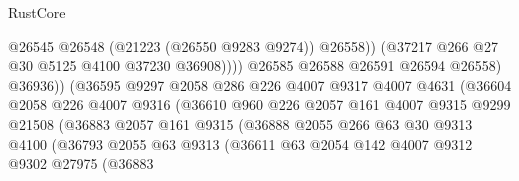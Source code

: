 \begin{lexlean}{RustCore}
\begin{coremodule}
                                              @26545
                                              @26548
                                              (@21223 (@26550 @9283 @9274))
                                              @26558))
                                          (@37217 @266 @27 @30 @5125 @4100 @37230 @36908))))
                                    @26585
                                    @26588
                                    @26591
                                    @26594
                                    @26558)
                                  @36936))
                              (@36595
                                @9297
                                @2058
                                @286
                                @226
                                @4007
                                @9317
                                @4007
                                @4631
                                (@36604
                                  @2058
                                  @226
                                  @4007
                                  @9316
                                  (@36610
                                    @960
                                    @226
                                    @2057
                                    @161
                                    @4007
                                    @9315
                                    @9299
                                    @21508
                                    (@36883
                                      @2057
                                      @161
                                      @9315
                                      (@36888
                                        @2055
                                        @266
                                        @63
                                        @30
                                        @9313
                                        @4100
                                        (@36793
                                          @2055
                                          @63
                                          @9313
                                          (@36611
                                            @63
                                            @2054
                                            @142
                                            @4007
                                            @9312
                                            @9302
                                            @27975
                                            (@36883

\end{coremodule}
\end{lexlean}
